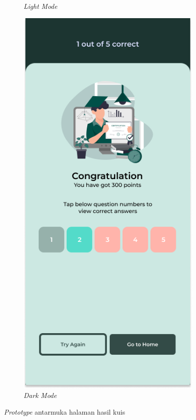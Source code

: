 \begin{figure}[H]
\begin{subfigure}[b]{0.23\textwidth}
	  \caption{\textit{Light Mode}}
	  \label{fig:HasilQuizResult}
	\end{subfigure}
	\begin{subfigure}[b]{0.23\textwidth}
		\centering
	  \includegraphics[width=\linewidth]{contents/chapter-3/images/HF-result-dt.png}
	  \caption{\textit{Dark Mode}}
	  \label{fig:HasilQuizResult2}
	\end{subfigure}
	\caption{\textit{Prototype} antarmuka halaman hasil kuis}
	\label{Fig:HasilFeatureSetQuizResult}
\end{figure}
